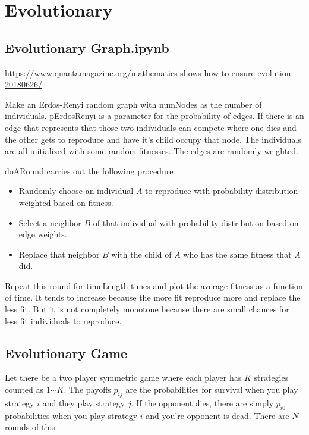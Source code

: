 \documentclass[11pt]{book}
\theoremstyle{change}
\theoremstyle{nonumberplain}
\numberwithin{equation}{section}
\begin{document}
\chapter{Evolutionary}

\section{Evolutionary Graph.ipynb}

\url{https://www.quantamagazine.org/mathematics-shows-how-to-ensure-evolution-20180626/}

Make an Erdos-Renyi random graph with numNodes as the number of individuals. pErdosRenyi is a parameter for the probability of edges. If there is an edge that represents that those two individuals can compete where one dies and the other gets to reproduce and have it's child occupy that node. The individuals are all initialized with some random fitnesses. The edges are randomly weighted.

doARound carries out the following procedure

\begin{itemize}
\setlength\itemsep{-1em}
\item Randomly choose an individual $A$ to reproduce with probability distribution weighted based on fitness.\\
\item Select a neighbor $B$ of that individual with probability distribution based on edge weights.\\
\item Replace that neighbor $B$ with the child of $A$ who has the same fitness that $A$ did.
\end{itemize}

Repeat this round for timeLength times and plot the average fitness as a function of time. It tends to increase because the more fit reproduce more and replace the less fit. But it is not completely monotone because there are small chances for less fit individuals to reproduce.

\section{Evolutionary Game}

\cite{Wakeley}

Let there be a two player symmetric game where each player has $K$ strategies counted as $1 \cdots K$. The payoffs $p_{ij}$ are the probabilities for survival when you play strategy $i$ and they play strategy $j$. If the opponent dies, there are simply $p_{i0}$ probabilities when you play strategy $i$ and you're opponent is dead. There are $N$ rounds of this.
\end{document}
